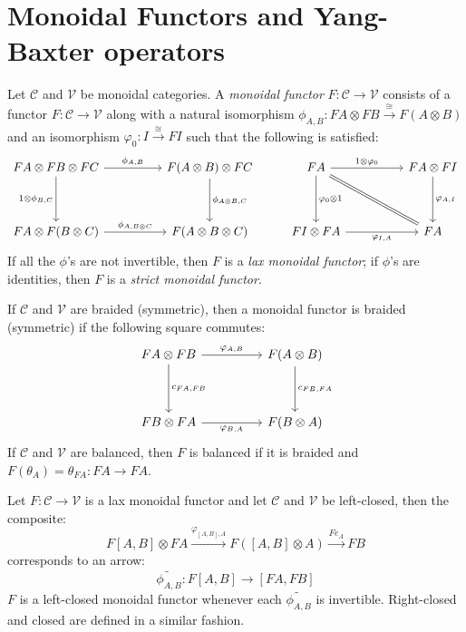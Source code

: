 \documentclass[8pt]{article}
\theoremstyle{definition}
\theoremstyle{definition}
\theoremstyle{definition}
\theoremstyle{definition}
\theoremstyle{definition}
\theoremstyle{definition}
\theoremstyle{definition}
\theoremstyle{definition}
\theoremstyle{definition}
\theoremstyle{definition}
\theoremstyle{definition}
\theoremstyle{definition}
\theoremstyle{definition}
\theoremstyle{definition}
\theoremstyle{question}
\begin{document}
  \section{Monoidal Functors and Yang-Baxter operators}
  Let $\mathcal{C}$ and $\mathcal{V}$ be monoidal categories. A \emph{monoidal functor} $F : \mathcal{C} \to \mathcal{V}$ consists of a functor $F : \mathcal{C} \to \mathcal{V}$
  along with a natural isomorphism $\phi_{A, B} : F A \otimes F B \xrightarrow{\cong} F(A \otimes B)$ and an isomorphism $\varphi_0 : I \xrightarrow{\cong} F I$ such
  that the following is satisfied:
  \[
  \begin{tikzcd}
    F A \otimes F B \otimes F C \ar[rr, "\phi_{A,B}"] \ar[dd, "1 \otimes \phi_{B,C}"'] && F (A \otimes B) \otimes F C \ar[dd, "\phi_{A \otimes B, C}"] & F A \ar[rr, "1 \otimes \varphi_0"] \ar[dd, "\varphi_0 \otimes 1"] \ar[ddrr, equal] && F A \otimes F I \ar[dd, "\varphi_{A,I}"]\\
    \\
    F A \otimes F (B \otimes C) \ar[rr, "\phi_{A, B \otimes C}"] && F (A \otimes B \otimes C)                                                          & F I \otimes F A  \ar[rr, "\varphi_{I,A}"']  && F A
  \end{tikzcd}
  \]
  If all the $\phi$'s are not invertible, then $F$ is a \emph{lax monoidal functor}; if $\phi$'s are identities, then $F$ is a \emph{strict monoidal functor}.

  If $\mathcal{C}$ and $\mathcal{V}$ are braided (symmetric), then a monoidal functor is braided (symmetric) if the following square commutes:
  \[
  \begin{tikzcd}
    F A \otimes F B \ar[rr, "\varphi_{A,B}"] \ar[dd, "c_{FA, FB}"] && F(A \otimes B) \ar[dd, "c_{FB, FA}"] \\
    \\
    F B \otimes F A \ar[rr, "\varphi_{B, A}"'] && F(B \otimes A)
  \end{tikzcd}
  \]
  If $\mathcal{C}$ and $\mathcal{V}$ are balanced, then $F$ is balanced if it is braided and $F(\theta_A) = \theta_{F A} : F A \to F A$.

  Let $F : \mathcal{C} \to \mathcal{V}$ is a lax monoidal functor and let $\mathcal{C}$ and $\mathcal{V}$ be left-closed, then the composite:
  \[
  F [A, B] \otimes F A \xrightarrow{\varphi_{[A,B], A}} F ([A, B] \otimes A) \xrightarrow{F e_A} F B
  \]
  corresponds to an arrow:
  \[
  \tilde{\phi_{A,B}} : F [A, B] \to [FA, FB]
  \]
  $F$ is a left-closed monoidal functor whenever each $\tilde{\phi_{A,B}}$ is invertible. Right-closed and closed are defined in a similar fashion.
\end{document}
